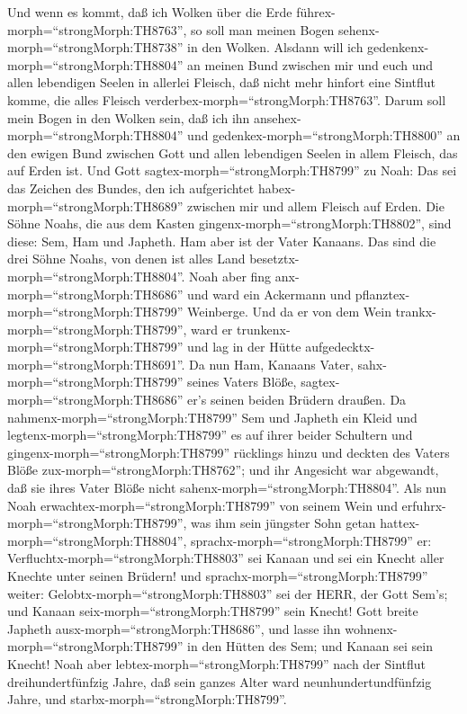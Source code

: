  Und wenn es kommt, daß ich Wolken über die Erde
führex-morph=``strongMorph:TH8763'', so soll man meinen Bogen
sehenx-morph=``strongMorph:TH8738'' in den Wolken.  Alsdann
will ich gedenkenx-morph=``strongMorph:TH8804'' an meinen Bund zwischen
mir und euch und allen lebendigen Seelen in allerlei Fleisch, daß nicht
mehr hinfort eine Sintflut komme, die alles Fleisch
verderbex-morph=``strongMorph:TH8763''.  Darum soll mein
Bogen in den Wolken sein, daß ich ihn
ansehex-morph=``strongMorph:TH8804'' und
gedenkex-morph=``strongMorph:TH8800'' an den ewigen Bund zwischen Gott
und allen lebendigen Seelen in allem Fleisch, das auf Erden ist.
 Und Gott sagtex-morph=``strongMorph:TH8799'' zu Noah: Das
sei das Zeichen des Bundes, den ich aufgerichtet
habex-morph=``strongMorph:TH8689'' zwischen mir und allem Fleisch auf
Erden.  Die Söhne Noahs, die aus dem Kasten
gingenx-morph=``strongMorph:TH8802'', sind diese: Sem, Ham und Japheth.
Ham aber ist der Vater Kanaans.  Das sind die drei Söhne
Noahs, von denen ist alles Land besetztx-morph=``strongMorph:TH8804''.
 Noah aber fing anx-morph=``strongMorph:TH8686'' und ward
ein Ackermann und pflanztex-morph=``strongMorph:TH8799'' Weinberge.
 Und da er von dem Wein
trankx-morph=``strongMorph:TH8799'', ward er
trunkenx-morph=``strongMorph:TH8799'' und lag in der Hütte
aufgedecktx-morph=``strongMorph:TH8691''.  Da nun Ham,
Kanaans Vater, sahx-morph=``strongMorph:TH8799'' seines Vaters Blöße,
sagtex-morph=``strongMorph:TH8686'' er's seinen beiden Brüdern draußen.
 Da nahmenx-morph=``strongMorph:TH8799'' Sem und Japheth
ein Kleid und legtenx-morph=``strongMorph:TH8799'' es auf ihrer beider
Schultern und gingenx-morph=``strongMorph:TH8799'' rücklings hinzu und
deckten des Vaters Blöße zux-morph=``strongMorph:TH8762''; und ihr
Angesicht war abgewandt, daß sie ihres Vater Blöße nicht
sahenx-morph=``strongMorph:TH8804''.  Als nun Noah
erwachtex-morph=``strongMorph:TH8799'' von seinem Wein und
erfuhrx-morph=``strongMorph:TH8799'', was ihm sein jüngster Sohn getan
hattex-morph=``strongMorph:TH8804'', 
sprachx-morph=``strongMorph:TH8799'' er:
Verfluchtx-morph=``strongMorph:TH8803'' sei Kanaan und sei ein Knecht
aller Knechte unter seinen Brüdern!  und
sprachx-morph=``strongMorph:TH8799'' weiter:
Gelobtx-morph=``strongMorph:TH8803'' sei der HERR, der Gott Sem's; und
Kanaan seix-morph=``strongMorph:TH8799'' sein Knecht!  Gott
breite Japheth ausx-morph=``strongMorph:TH8686'', und lasse ihn
wohnenx-morph=``strongMorph:TH8799'' in den Hütten des Sem; und Kanaan
sei sein Knecht!  Noah aber
lebtex-morph=``strongMorph:TH8799'' nach der Sintflut dreihundertfünfzig
Jahre,  daß sein ganzes Alter ward neunhundertundfünfzig
Jahre, und starbx-morph=``strongMorph:TH8799''.

